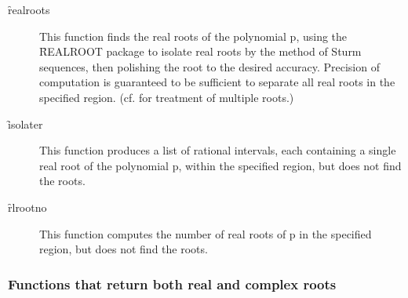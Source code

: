 \begin{description}

\item[\f{realroots}]
   
  \hypertarget{operator:REALROOTS}{}
This function finds the real roots of the polynomial p,
using the \f{REALROOT} package to isolate real roots by the method of Sturm
sequences, then polishing the root to the desired accuracy.  Precision
of computation is guaranteed to be sufficient to separate all real roots
in the specified region.  (cf.  for treatment of multiple
roots.)

\item[\f{isolater}]
  \hypertarget{operator:ISOLATER}{}
This function produces a list of rational intervals, each
containing a single real root of the polynomial p, within the specified
region, but does not find the roots.

\item[\f{rlrootno}]
  \hypertarget{operator:RLROOTNO}{}
This function computes the number of real roots of p in
the specified region, but does not find the roots.
\end{description}

\subsubsection{Functions that return both real and complex roots}


